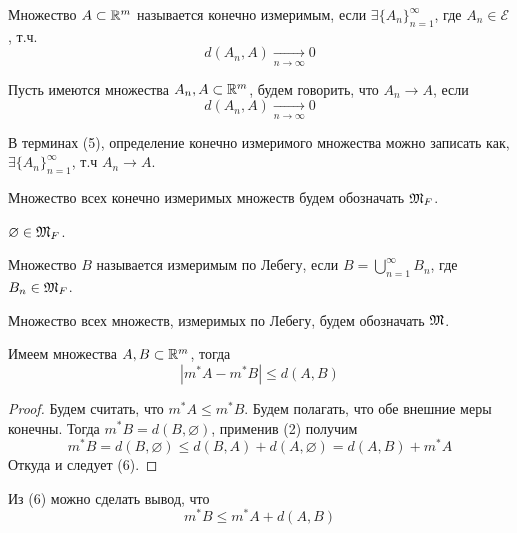 \documentclass[main]{subfiles}
\begin{document}
\begin{definition}
    Множество $A \subset \mathbb{R}^m$ называется конечно измеримым, если $\exists \{A_n\}_{n=1}^\infty$, где $A_n \in \mathcal{E}$, т.ч.
    \[d(A_n, A) \xrightarrow[n \to \infty]{} 0 \tag{4}\]
\end{definition}
\begin{definition}
    Пусть имеются множества $A_n, A \subset \mathbb{R}^m$, будем говорить, что $A_n \to A$, если
    \[d(A_n, A) \xrightarrow[n \to \infty]{} 0 \tag{5}\]
\end{definition}
\begin{remark}
    В терминах (5), определение конечно измеримого множества можно записать как, $\exists \{A_n\}_{n=1}^\infty$, т.ч $A_n \to A$.
\end{remark}
\begin{definition}
    Множество всех конечно измеримых множеств будем обозначать $\mathfrak{M}_F$.
\end{definition}
\begin{remark}
    $\varnothing \in \mathfrak{M}_F$.
\end{remark}
\begin{definition}
    Множество $B$ называется измеримым по Лебегу, если $B = \bigcup_{n=1}^\infty B_n$, где $B_n \in \mathfrak{M}_F$.
\end{definition}
\begin{definition}
    Множество всех множеств, измеримых по Лебегу, будем обозначать $\mathfrak{M}$.
\end{definition}

\begin{lemma}
    Имеем множества $A, B \subset \mathbb{R}^m$, тогда
    \[|m^*A - m^*B| \le d(A, B) \tag{6}\]
\end{lemma}
\begin{proof}
    Будем считать, что $m^* A \le m^*B$.
    Будем полагать, что обе внешние меры конечны.
    Тогда $m^*B = d(B, \varnothing)$, применив (2) получим
    \[m^*B = d(B, \varnothing) \le d(B, A) + d(A, \varnothing) = d(A, B) + m^*A\]
    Откуда и следует (6).
\end{proof}
Из (6) можно сделать вывод, что
\[m^*B \le m^*A + d(A, B) \tag{7}\]
\end{document}
